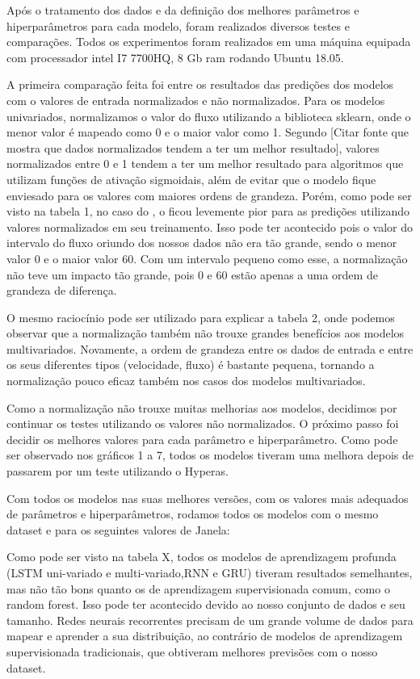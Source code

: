 Após o tratamento dos dados e da definição dos melhores parâmetros e hiperparâmetros para cada modelo, foram realizados diversos testes e comparações. Todos os experimentos foram realizados em uma máquina equipada com processador intel I7 7700HQ, 8 Gb ram rodando Ubuntu 18.05.

A primeira comparação feita foi entre os resultados das predições dos modelos com o valores de entrada normalizados e não normalizados. Para os modelos univariados, normalizamos o valor do fluxo utilizando a biblioteca sklearn, onde o menor valor é mapeado como 0 e o maior valor como 1. Segundo [Citar fonte que mostra que dados normalizados tendem a ter um melhor resultado], valores normalizados entre 0 e 1 tendem a ter um melhor resultado para algoritmos que utilizam funções de ativação sigmoidais, além de evitar que o modelo fique enviesado para os valores com maiores ordens de grandeza. Porém, como pode ser visto na tabela 1, no caso do , o  ficou levemente pior para as predições utilizando valores normalizados em seu treinamento. Isso pode ter acontecido pois o valor do intervalo do fluxo oriundo dos nossos dados não era tão grande, sendo o menor valor 0 e o maior valor 60. Com um intervalo pequeno como esse, a normalização não teve um impacto tão grande, pois 0 e 60 estão apenas a uma ordem de grandeza de diferença.

O mesmo raciocínio pode ser utilizado para explicar a tabela 2, onde podemos observar que a normalização também não trouxe grandes benefícios aos modelos multivariados. Novamente, a ordem de grandeza entre os dados de entrada e entre os seus diferentes tipos (velocidade, fluxo) é bastante pequena, tornando a normalização pouco eficaz também nos casos dos modelos multivariados.

Como a normalização não trouxe muitas melhorias aos modelos, decidimos por continuar os testes utilizando os valores não normalizados. O próximo passo foi decidir os melhores valores para cada parâmetro e hiperparâmetro. Como pode ser observado nos gráficos 1  a 7, todos os modelos tiveram uma melhora depois de passarem por um teste utilizando o Hyperas.

Com todos os modelos nas suas melhores versões, com os valores mais adequados de parâmetros e hiperparâmetros, rodamos todos os modelos com o mesmo dataset e para os seguintes valores de Janela: 


Como pode ser visto na tabela X,  todos  os  modelos  de aprendizagem  profunda  (LSTM  uni-variado  e  multi-variado,RNN  e  GRU)  tiveram  resultados  semelhantes,  mas  não  tão bons quanto os de aprendizagem supervisionada comum, como o random forest. Isso  pode  ter  acontecido  devido  ao  nosso  conjunto  de dados  e  seu  tamanho.  Redes  neurais  recorrentes  precisam de  um  grande  volume  de  dados  para  mapear  e  aprender  a sua  distribuição,  ao  contrário  de  modelos  de  aprendizagem supervisionada  tradicionais, que obtiveram melhores previsões com o nosso dataset.

